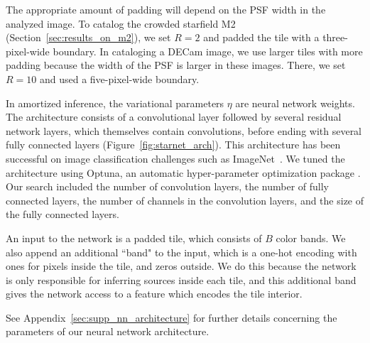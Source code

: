 The appropriate amount of padding will depend on the PSF width in the analyzed image.
To catalog the crowded starfield M2 (Section~\ref{sec:results_on_m2}),
we set $R = 2$ and padded the tile with a three-pixel-wide boundary.
In cataloging a DECam image, we use larger tiles with more padding because the width of the PSF is larger in these images. There, we set $R = 10$ and used a five-pixel-wide boundary.


In amortized inference, the variational parameters $\eta$ are neural network weights.
The architecture consists of a convolutional layer followed by several residual network layers, which themselves contain convolutions, before ending with several fully connected layers (Figure~\ref{fig:starnet_arch}).
This architecture has been successful on image classification challenges such as ImageNet~\citep{imagenet2015}.
We tuned the architecture using Optuna, an automatic hyper-parameter optimization package \citep{optuna_2019}. 
Our search included the number of convolution layers, 
the number of fully connected layers,
the number of channels in the convolution layers, and the size of the fully connected layers. 

An input to the network is a padded tile, which consists of $B$ color bands. 
We also append an additional ``band" to the input, which 
is a one-hot encoding with
ones for pixels inside the tile, and zeros outside. 
We do this because the network is only responsible for inferring sources inside each tile, and this additional band gives
the network access to a feature which encodes the tile interior. 

See Appendix~\ref{sec:supp_nn_architecture} for further details 
concerning the parameters of our neural network architecture. 



